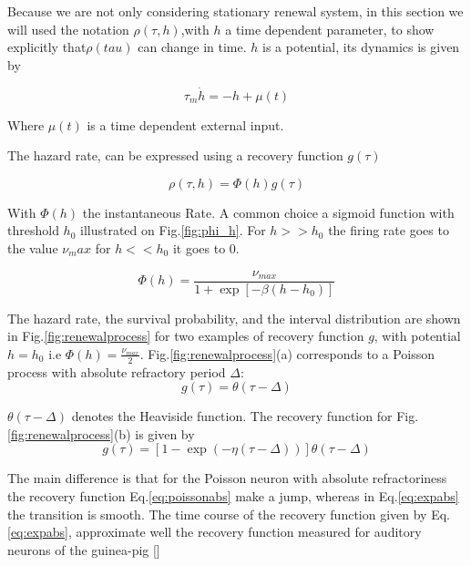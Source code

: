 \documentclass[12pt,twoside]{report}
\begin{document}
Because we are not only considering stationary renewal system, in this section we will used the notation $\rho(\tau,h)$,with $h$ a time dependent parameter, to show explicitly that$\rho(tau)$ can change in time. $h$ is a potential, its dynamics is given by

\begin{equation}
\label{eq:hi}
\tau_m\dot h=-h+\mu(t)
\end{equation}


Where $\mu(t)$ is a time dependent external input.

The hazard rate, can be expressed using a recovery function $g(\tau)$

\begin{equation}
\label{eq:rho}
\rho(\tau,h)=\Phi(h)g(\tau)
\end{equation}

With $\Phi(h)$ the instantaneous Rate. A common choice a sigmoid function with threshold $h_0$ illustrated on Fig.\ref{fig:phi_h}. For $h>>h_0$ the firing rate goes to the value $\nu_max$ for $h<<h_0$ it goes to $0$.

\begin{equation}
\label{eq:phi}
\Phi(h)=\frac{\nu_{max}}{1+\exp[-\beta(h-h_0)]}
\end{equation}



The hazard rate, the survival probability, and the interval distribution are shown in Fig.\ref{fig:renewalprocess} for two examples of recovery function $g$, with potential $h=h_0$ i.e $\Phi(h)=\frac{\nu_{max}}{2}$. Fig.\ref{fig:renewalprocess}(a) corresponds to a Poisson process with absolute refractory period $\Delta$: 
\begin{equation}
\label{eq:poissonabs}
g(\tau)=\theta(\tau-\Delta)
\end{equation}

$\theta(\tau-\Delta)$ denotes the Heaviside function. The recovery function for Fig.\ref{fig:renewalprocess}(b) is given by
\begin{equation}
\label{eq:expabs}
g(\tau)=\left[1-\exp(-\eta(\tau-\Delta))\right]\theta(\tau-\Delta)
\end{equation}

The main difference is that for the Poisson neuron with absolute refractoriness the recovery function Eq.\eqref{eq:poissonabs} make a jump, whereas in Eq.\eqref{eq:expabs} the transition is smooth. The time course of the recovery function given by Eq.\eqref{eq:expabs}, approximate well the recovery function measured for  auditory neurons  of the guinea-pig [\cite{Prij93}]
\end{document}
